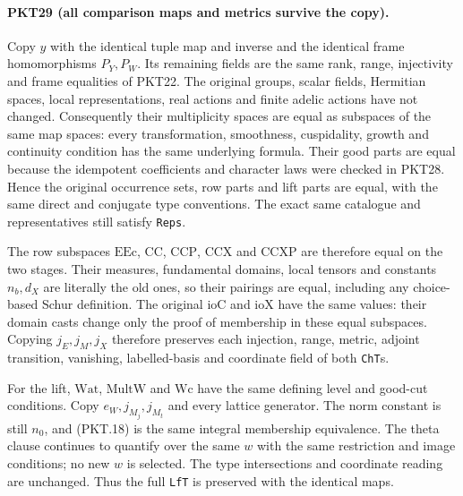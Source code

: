 \paragraph{PKT29 (all comparison maps and metrics survive the copy).}\label{claim:PKT29}
Copy $y$ with the identical tuple map and inverse and the identical frame
homomorphisms $P_Y,P_W$.  Its remaining fields are the same rank, range,
injectivity and frame equalities of PKT22.  The original groups, scalar
fields, Hermitian spaces, local representations, real actions and finite
adelic actions have not changed.  Consequently their multiplicity spaces
are equal as subspaces of the same map spaces: every transformation,
smoothness, cuspidality, growth and continuity condition has the same
underlying formula.  Their good parts are equal because the idempotent
coefficients and character laws were checked in PKT28.  Hence the original
occurrence sets, row parts and lift parts are equal, with the same direct
and conjugate type conventions.  The exact same catalogue and
representatives still satisfy \texttt{Reps}.

The row subspaces $\mathrm{EEc}$, $\mathrm{CC}$, $\mathrm{CCP}$,
$\mathrm{CCX}$ and $\mathrm{CCXP}$ are therefore equal on the two stages.
Their measures, fundamental domains, local tensors and constants $n_b,d_X$
are literally the old ones, so their pairings are equal, including any
choice-based Schur definition.  The original $\mathrm{ioC}$ and
$\mathrm{ioX}$ have the same values: their domain casts change only the
proof of membership in these equal subspaces.  Copying $j_E,j_M,j_X$
therefore preserves each injection, range, metric, adjoint transition,
vanishing, labelled-basis and coordinate field of both \texttt{ChT}s.

For the lift, $\mathrm{Wat}$, $\mathrm{MultW}$ and $\mathrm{Wc}$ have the
same defining level and good-cut conditions.  Copy $e_W,j_{M_j},j_{M_t}$
and every lattice generator.  The norm constant is still $n_0$, and
(PKT.18) is the same integral membership equivalence.  The theta clause
continues to quantify over the same $w$ with the same restriction and
image conditions; no new $w$ is selected.  The type intersections and
coordinate reading are unchanged.  Thus the full \texttt{LfT} is
preserved with the identical maps.

